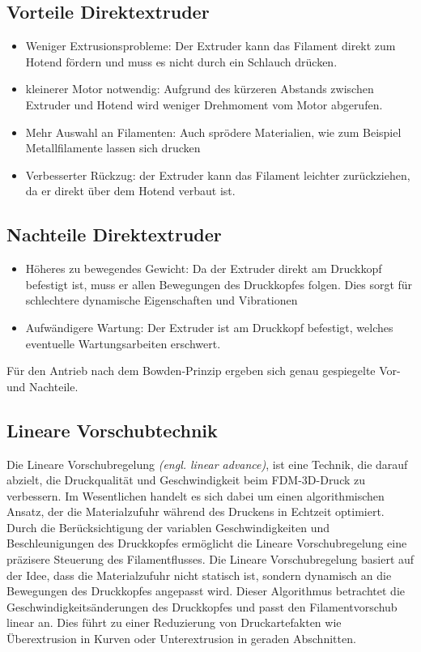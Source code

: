 \subsection*{Vorteile Direktextruder}
\begin{itemize}[label=+]
    \item Weniger Extrusionsprobleme: Der Extruder kann das Filament direkt zum Hotend fördern und muss es nicht durch ein Schlauch drücken.
    \item kleinerer Motor notwendig: Aufgrund des kürzeren Abstands zwischen Extruder und Hotend wird weniger Drehmoment vom Motor abgerufen.
    \item Mehr Auswahl an Filamenten: Auch sprödere Materialien, wie zum Beispiel Metallfilamente lassen sich drucken
    \item Verbesserter Rückzug: der Extruder kann das Filament leichter zurückziehen, da er direkt über dem Hotend verbaut ist.
\end{itemize}

\subsection*{Nachteile Direktextruder}
\begin{itemize}[label=-]
    \item Höheres zu bewegendes Gewicht: Da der Extruder direkt am Druckkopf befestigt ist, muss er allen Bewegungen des Druckkopfes folgen. Dies sorgt für schlechtere dynamische Eigenschaften und Vibrationen
    \item Aufwändigere Wartung: Der Extruder ist am Druckkopf befestigt, welches eventuelle Wartungsarbeiten erschwert.
\end{itemize}

Für den Antrieb nach dem Bowden-Prinzip ergeben sich genau gespiegelte Vor- und Nachteile. \autocite{facfox}

\subsection{Lineare Vorschubtechnik}

Die Lineare Vorschubregelung \textit{(engl. linear advance)}, ist eine Technik, die darauf abzielt, die Druckqualität und Geschwindigkeit beim FDM-3D-Druck zu verbessern. Im Wesentlichen handelt es sich dabei um einen algorithmischen Ansatz, der die Materialzufuhr während des Druckens in Echtzeit optimiert. Durch die Berücksichtigung der variablen Geschwindigkeiten und Beschleunigungen des Druckkopfes ermöglicht die Lineare Vorschubregelung eine präzisere Steuerung des Filamentflusses.
Die Lineare Vorschubregelung basiert auf der Idee, dass die Materialzufuhr nicht statisch ist, sondern dynamisch an die Bewegungen des Druckkopfes angepasst wird. Dieser Algorithmus betrachtet die Geschwindigkeitsänderungen des Druckkopfes und passt den Filamentvorschub linear an. Dies führt zu einer Reduzierung von Druckartefakten wie Überextrusion in Kurven oder Unterextrusion in geraden Abschnitten. \autocite{prusaLinearAdvance}

